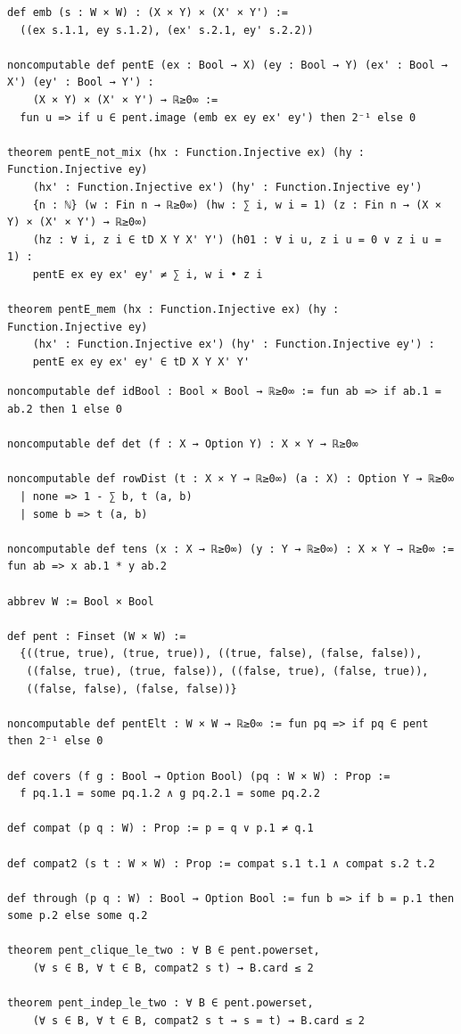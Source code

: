 \label{lean:pente-not-mix}
\begin{lstlisting}
def emb (s : W × W) : (X × Y) × (X' × Y') :=
  ((ex s.1.1, ey s.1.2), (ex' s.2.1, ey' s.2.2))

noncomputable def pentE (ex : Bool → X) (ey : Bool → Y) (ex' : Bool → X') (ey' : Bool → Y') :
    (X × Y) × (X' × Y') → ℝ≥0∞ :=
  fun u => if u ∈ pent.image (emb ex ey ex' ey') then 2⁻¹ else 0

theorem pentE_not_mix (hx : Function.Injective ex) (hy : Function.Injective ey)
    (hx' : Function.Injective ex') (hy' : Function.Injective ey')
    {n : ℕ} (w : Fin n → ℝ≥0∞) (hw : ∑ i, w i = 1) (z : Fin n → (X × Y) × (X' × Y') → ℝ≥0∞)
    (hz : ∀ i, z i ∈ tD X Y X' Y') (h01 : ∀ i u, z i u = 0 ∨ z i u = 1) :
    pentE ex ey ex' ey' ≠ ∑ i, w i • z i

theorem pentE_mem (hx : Function.Injective ex) (hy : Function.Injective ey)
    (hx' : Function.Injective ex') (hy' : Function.Injective ey') :
    pentE ex ey ex' ey' ∈ tD X Y X' Y'
\end{lstlisting}

\label{lean:pent-cycle}
\begin{lstlisting}
noncomputable def idBool : Bool × Bool → ℝ≥0∞ := fun ab => if ab.1 = ab.2 then 1 else 0

noncomputable def det (f : X → Option Y) : X × Y → ℝ≥0∞

noncomputable def rowDist (t : X × Y → ℝ≥0∞) (a : X) : Option Y → ℝ≥0∞
  | none => 1 - ∑ b, t (a, b)
  | some b => t (a, b)

noncomputable def tens (x : X → ℝ≥0∞) (y : Y → ℝ≥0∞) : X × Y → ℝ≥0∞ := fun ab => x ab.1 * y ab.2

abbrev W := Bool × Bool

def pent : Finset (W × W) :=
  {((true, true), (true, true)), ((true, false), (false, false)),
   ((false, true), (true, false)), ((false, true), (false, true)),
   ((false, false), (false, false))}

noncomputable def pentElt : W × W → ℝ≥0∞ := fun pq => if pq ∈ pent then 2⁻¹ else 0

def covers (f g : Bool → Option Bool) (pq : W × W) : Prop :=
  f pq.1.1 = some pq.1.2 ∧ g pq.2.1 = some pq.2.2

def compat (p q : W) : Prop := p = q ∨ p.1 ≠ q.1

def compat2 (s t : W × W) : Prop := compat s.1 t.1 ∧ compat s.2 t.2

def through (p q : W) : Bool → Option Bool := fun b => if b = p.1 then some p.2 else some q.2

theorem pent_clique_le_two : ∀ B ∈ pent.powerset,
    (∀ s ∈ B, ∀ t ∈ B, compat2 s t) → B.card ≤ 2

theorem pent_indep_le_two : ∀ B ∈ pent.powerset,
    (∀ s ∈ B, ∀ t ∈ B, compat2 s t → s = t) → B.card ≤ 2
\end{lstlisting}

